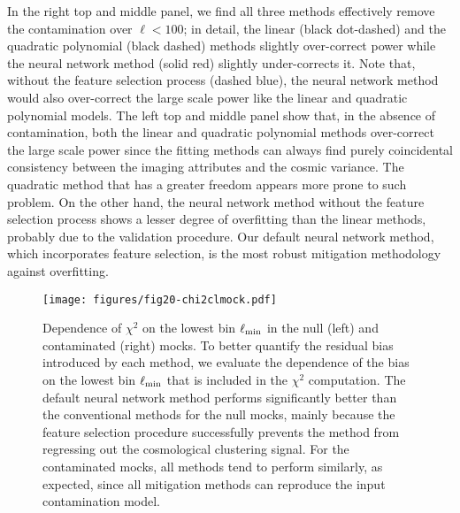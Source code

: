 In the right top and middle panel, we find all three methods effectively remove the contamination over $\ell < 100$; in detail, the linear (black dot-dashed) and the quadratic polynomial (black dashed) methods slightly over-correct power while the neural network method (solid red) slightly under-corrects it. Note that, without the feature selection process (dashed blue), the neural network method would also over-correct the large scale power like the linear and quadratic polynomial models. The left top and middle panel show that, in the absence of contamination, both the linear and quadratic polynomial methods over-correct the large scale power since the fitting methods can always find purely coincidental consistency between the imaging attributes and the cosmic variance. The quadratic method that has a greater freedom appears more prone to such problem. On the other hand, the neural network method without the feature selection process shows a lesser degree of overfitting than the linear methods, probably due to the validation procedure. Our default neural network method, which incorporates feature selection, is the most robust mitigation methodology against overfitting.\\

\begin{figure*}
\centering
\texttt{[image: figures/fig20-chi2clmock.pdf]}
\caption{Dependence of $\chi^{2}$ on the lowest bin $\ell_{\rm min}$ in the null (left) and contaminated (right) mocks. To better quantify the residual bias introduced by each method, we evaluate the dependence of the bias on the lowest bin $\ell_{{\rm min}}$ that is included in the $\chi^{2}$ computation. The default neural network method performs significantly better than the conventional methods for the null mocks, mainly because the feature selection procedure successfully prevents the method from regressing out the cosmological clustering signal. For the contaminated mocks, all methods tend to perform similarly, as expected, since all mitigation methods can reproduce the input contamination model. }\label{fig:chi2clmock}
\end{figure*}


